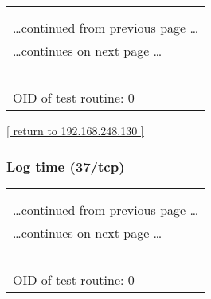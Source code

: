 \documentclass{article}
\begin{document}
\begin{longtable}{|p{}|}
\hline
\rowcolor{openvas_log}{\color{white}{Log}}\\
\rowcolor{openvas_log}{\color{white}{NVT: }}\\
\hline
\endfirsthead
\hfill\ldots continued from previous page \ldots \\
\hline
\endhead
\hline
\ldots continues on next page \ldots \\
\endfoot
\hline
\endlastfoot
\\
\rowcolor{white}{\verb=Open port.=}\\
\rowcolor{white}{\verb==}\\
\rowcolor{white}{\verb==}\\
\\
OID of test routine: 0\\
\end{longtable}

\begin{footnotesize}\hyperref[host:192.168.248.130]{[ return to 192.168.248.130 ]}\end{footnotesize}
\subsubsection{Log time (37/tcp)}
\label{port:192.168.248.130 time (37/tcp) Log}

\begin{longtable}{|p{}|}
\hline
\rowcolor{openvas_log}{\color{white}{Log}}\\
\rowcolor{openvas_log}{\color{white}{NVT: }}\\
\hline
\endfirsthead
\hfill\ldots continued from previous page \ldots \\
\hline
\endhead
\hline
\ldots continues on next page \ldots \\
\endfoot
\hline
\endlastfoot
\\
\rowcolor{white}{\verb=Open port.=}\\
\rowcolor{white}{\verb==}\\
\rowcolor{white}{\verb==}\\
\\
OID of test routine: 0\\
\end{longtable}
\end{document}
